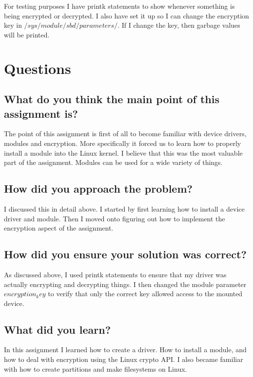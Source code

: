 \documentclass[letterpaper,10pt,titlepage,draftclsnofoot,onecolumn]{IEEEtran}
\begin{document}
For testing purposes I have printk statements to show whenever something is being encrypted or decrypted. I also have set it up so I can change the encryption key in $/sys/module/sbd/parameters/$. If I change the key, then garbage values will be printed.

\section{Questions}
\subsection{What do you think the main point of this assignment is?}

The point of this assignment is first of all to become familiar with device drivers, modules and encryption. More specifically it forced us to learn how to properly install a module into the Linux kernel. I believe that this was the most valuable part of the assignment. Modules can be used for a wide variety of things. 

\subsection{How did you approach the problem?}
I discussed this in detail above. I started by first learning how to install a device driver and module. Then I moved onto figuring out how to implement the encryption aspect of the assignment.

\subsection{How did you ensure your solution was correct?}
As discussed above, I used printk statements to ensure that my driver was actually encrypting and decrypting things. I then changed the module parameter $encryption_key$ to verify that only the correct key allowed access to the mounted device. 

\subsection{What did you learn?}
In this assignment I learned how to create a driver. How to install a module, and how to deal with encryption using the Linux crypto API. I also became familiar with how to create partitions and make filesystems on Linux. 
\end{document}
